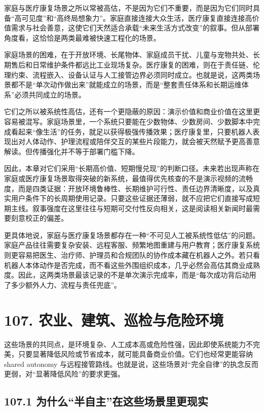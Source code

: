 家庭与医疗康复场景之所以常被高估，不是因为它们不重要，而是因为它们同时具备“高可见度”和“高终局想象力”。家庭直接连接大众生活，医疗康复直接连接高价值需求与社会善意，这使它们天然适合承载“未来生活方式改变”的叙事。但从部署角度看，这恰恰是两类最难被快速工程化的场景。

家庭场景的困难，在于开放环境、长尾物体、家庭成员干扰、儿童与宠物共处、长期售后和日常维护条件都远比工业现场复杂。医疗康复的困难，则在于责任链、伦理约束、流程嵌入、设备认证与人工接管边界必须同时成立。也就是说，这两类场景都不是“单次动作做出来”就能成立的场景，而是“整套责任体系和长期运维体系”必须共同成立的场景。

它们之所以被系统性高估，还有一个更隐蔽的原因：演示价值和商业价值在这里更容易被混写。家庭场景里，一个系统只要能在少数物体、少数房间、少数脚本中完成看起来“像生活”的任务，就足以获得极强传播效果；医疗康复里，只要机器人表现出对人体动作、护理流程或陪伴交互的某些片段能力，就会被天然赋予更高善意解读。但传播强化并不等于部署门槛下降。

因此，本章对它们采用“长期高价值、短期慢兑现”的判断口径。未来若出现声称在家庭或医疗康复场景取得突破的新系统，最值得优先核查的不是演示视频的流畅度，而是四类证据：开放环境鲁棒性、长期维护可行性、责任边界清晰度，以及真实用户条件下的长周期使用记录。只要这些证据还薄弱，就不应把它们直接写成短期主线。叙事强度在这里往往与短期可交付性反向相关，这是阅读相关新闻时最需要刻意校正的偏差。

更具体地说，家庭与医疗康复场景都存在一种“不可见人工被系统性低估”的问题。家庭产品往往需要复杂安装、远程客服、频繁地图重建与用户教育；医疗康复系统则更容易把医生、治疗师、护理员和合规团队的协作成本藏在机器人之外。若只看机器人本体动作是否完成，而不看这些外围组织成本，几乎必然会高估其商业成熟度。因此，这两类场景最该记录的不是单次演示完成率，而是“每次成功背后动用了多少额外人力、流程与责任兜底”。

\section*{107. 农业、建筑、巡检与危险环境}

这些场景的共同点，是环境复杂、人工成本高或危险性强，因此即使系统能力不完美，只要显著降低风险或节省成本，就可能具备商业价值。它们也经常更能容纳 shared autonomy 与远程接管路线。也就是说，这些场景对“完全自律”的执念反而更弱，对“显著降低风险”的要求更强。

\subsection*{107.1 为什么“半自主”在这些场景里更现实}


